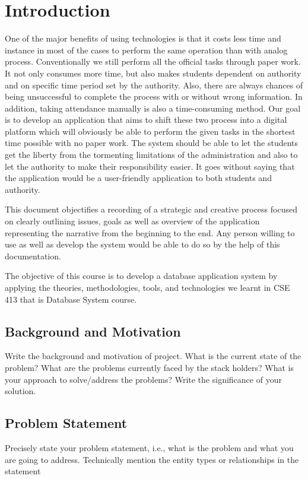
\section{Introduction}\label{sec:introduction}
One of the major benefits of using technologies is that it costs less time and instance in most of the cases to perform the same operation than with analog process. Conventionally we still perform all the official tasks through paper work. It not only consumes more time, but also makes students dependent on authority and on specific time period set by the authority. Also, there are always chances of being unsuccessful to complete the process with or without wrong information. In addition, taking attendance manually is also a time-consuming method. Our goal is to develop an application that aims to shift these two process into a digital platform which will obviously be able to perform the given tasks in the shortest time possible with no paper work. The system should be able to let the students get the liberty from the tormenting limitations of the administration and also to let the authority to make their responsibility easier. It goes without saying that the application would be a user-friendly application to both students and authority.

This document objectifies  a recording of a strategic and creative process focused on clearly outlining issues, goals as well as overview of the application representing the narrative from the beginning to the end. Any person willing to use as well as develop the system would be able to do so by the help of this documentation.

The objective of this course is to develop a database application system by applying the theories, methodologies, tools, and technologies we learnt in CSE 413 that is Database System course.  




\subsection{Background and Motivation}\label{subsec:bm}
Write the background and motivation of project. What is the current state of the problem? What are the problems currently faced by the stack holders? What is your approach to solve/address the problems? Write the significance of your solution.   

\subsection{Problem Statement}\label{subsec:ps} Precisely state your problem statement, i.e., what is the problem and what you are going to address. Technically mention the entity types or relationships in the statement

